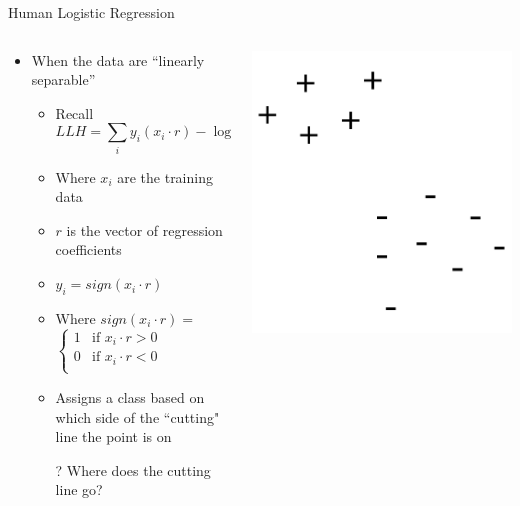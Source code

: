 \documentclass[aspectratio=169]{beamer}
\begin{document}
\begin{frame}{Human Logistic Regression}

\begin{columns}
\begin{column}{0.6\textwidth}
\begin{itemize}
\item When the data are ``linearly separable''
	\begin{itemize}
	\item Recall
	$$LLH = \sum_i y_i (x_i \cdot r) - \log (1 + e^{x_i \cdot r})$$
	\item Where $x_i$ are the training data
	\item $r$ is the vector of regression coefficients
	\item $y_i = sign(x_i \cdot  r)$
	\item Where $sign(x_i \cdot r) = $
	$\begin{cases} 1 & \textrm{if }x_i \cdot r > 0 \\
	 0 & \textrm{if } x_i \cdot r < 0 \\
	 \end{cases}$
	\item Assigns a class based on which side of the ``cutting" line the point is on
	\item[?] Where does the cutting line go?
	\end{itemize}
\end{itemize}
\end{column}
\begin{column}{0.4\textwidth}
\includegraphics[width=1\textwidth]{lectSVM/logR0.pdf}
\end{column}
\end{columns}
\end{frame}
\end{document}
